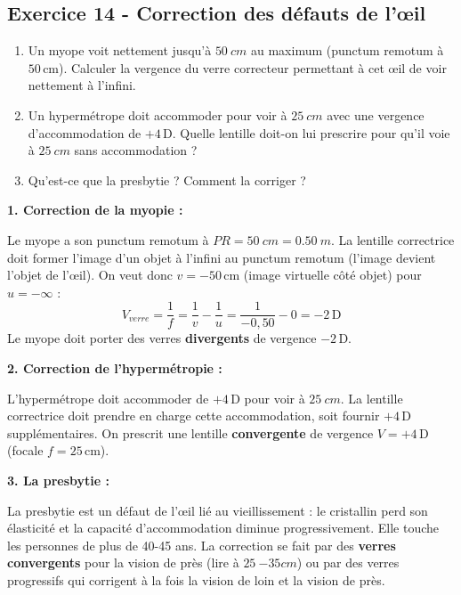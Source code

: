 \documentclass[12pt,a4paper]{article}
\begin{document}
\subsection*{Exercice 14 - Correction des défauts de l'\oe{}il \niveau{\moyen}}

\begin{boiteexercice}
\begin{enumerate}
  \item Un myope voit nettement jusqu'à $\qty{50}{cm}$ au maximum (punctum remotum à $50\,\text{cm}$). Calculer la vergence du verre correcteur permettant à cet \oe{}il de voir nettement à l'infini.
  \item Un hypermétrope doit accommoder pour voir à $\qty{25}{cm}$ avec une vergence d'accommodation de $+4\,\text{D}$. Quelle lentille doit-on lui prescrire pour qu'il voie à $\qty{25}{cm}$ sans accommodation ?
  \item Qu'est-ce que la presbytie ? Comment la corriger ?
\end{enumerate}
\end{boiteexercice}

\begin{boitecorrige}
\textbf{1. Correction de la myopie :}

Le myope a son punctum remotum à $PR = \qty{50}{cm} = \qty{0.50}{m}$. La lentille correctrice doit former l'image d'un objet à l'infini au punctum remotum (l'image devient l'objet de l'\oe{}il). On veut donc $v = -50\,\text{cm}$ (image virtuelle côté objet) pour $u = -\infty$ :
\[
V_{verre} = \frac{1}{f} = \frac{1}{v} - \frac{1}{u} = \frac{1}{-0{,}50} - 0 = -2\,\text{D}
\]
Le myope doit porter des verres \textbf{divergents} de vergence $-2\,\text{D}$.

\textbf{2. Correction de l'hypermétropie :}

L'hypermétrope doit accommoder de $+4\,\text{D}$ pour voir à $\qty{25}{cm}$. La lentille correctrice doit prendre en charge cette accommodation, soit fournir $+4\,\text{D}$ supplémentaires. On prescrit une lentille \textbf{convergente} de vergence $V = +4\,\text{D}$ (focale $f = 25\,\text{cm}$).

\textbf{3. La presbytie :}

La presbytie est un défaut de l'\oe{}il lié au vieillissement : le cristallin perd son élasticité et la capacité d'accommodation diminue progressivement. Elle touche les personnes de plus de 40-45 ans. La correction se fait par des \textbf{verres convergents} pour la vision de près (lire à $\qty{25}{-35}{cm}$) ou par des verres progressifs qui corrigent à la fois la vision de loin et la vision de près.
\end{boitecorrige}
\end{document}
